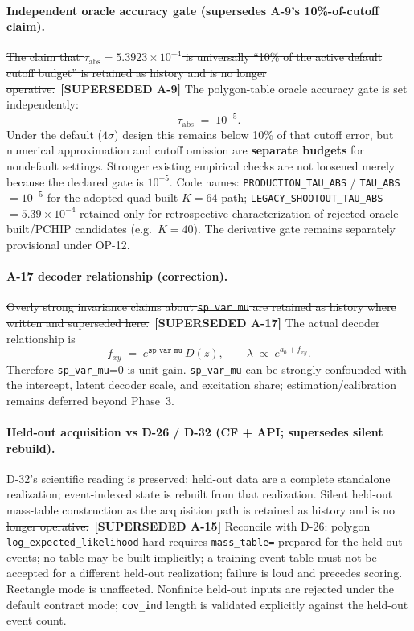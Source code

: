\documentclass[
  10pt,
]{article}
\newcommand{\amdstrike}[1]{\sout{#1}}
\newcommand{\amdstrike}[1]{\textcolor{supcolor}{#1}}
\newcommand{\supsd}[2]{{\color{supcolor}\amdstrike{#2}}~{\color{amdcolor}\footnotesize\textbf{[SUPERSEDED #1]}}}
\begin{document}
\paragraph{Independent oracle accuracy gate (supersedes A-9's 10\%-of-cutoff claim).}
\supsd{A-9}{The claim that \(\tau_{\mathrm{abs}} = 5.3923\times 10^{-4}\) is universally ``10\% of the active default cutoff budget'' is retained as history and is no longer operative.}
The polygon-table oracle accuracy gate is set independently:
\[
  \tau_{\mathrm{abs}} \;=\; 10^{-5}.
\]
Under the default (\(4\sigma\)) design this remains below 10\% of that cutoff error, but numerical approximation and cutoff omission are \textbf{separate budgets} for nondefault settings.
Stronger existing empirical checks are not loosened merely because the declared gate is \(10^{-5}\).
Code names: \texttt{PRODUCTION\_TAU\_ABS} / \texttt{TAU\_ABS} \(= 10^{-5}\) for the adopted quad-built \(K{=}64\) path; \texttt{LEGACY\_SHOOTOUT\_TAU\_ABS} \(= 5.39\times 10^{-4}\) retained only for retrospective characterization of rejected oracle-built/PCHIP candidates (e.g.\ \(K{=}40\)). The derivative gate remains separately provisional under OP-12.

\paragraph{A-17 decoder relationship (correction).}
\supsd{A-17}{Overly strong invariance claims about \texttt{sp\_var\_mu} are retained as history where written and superseded here.}
The actual decoder relationship is
\[
  f_{xy} \;=\; e^{\texttt{sp\_var\_mu}}\, D(z),
  \qquad
  \lambda \;\propto\; e^{a_0 + f_{xy}}.
\]
Therefore \texttt{sp\_var\_mu}=0 is unit gain.
\texttt{sp\_var\_mu} can be strongly confounded with the intercept, latent decoder scale, and excitation share; estimation/calibration remains deferred beyond Phase~3.

\paragraph{Held-out acquisition vs D-26 / D-32 (CF + API; supersedes silent rebuild).}
D-32's scientific reading is preserved: held-out data are a complete standalone realization; event-indexed state is rebuilt from that realization.
\supsd{A-15}{Silent held-out mass-table construction as the acquisition path is retained as history and is no longer operative.}
Reconcile with D-26: polygon \texttt{log\_expected\_likelihood} hard-requires \texttt{mass\_table=} prepared for the held-out events; no table may be built implicitly; a training-event table must not be accepted for a different held-out realization; failure is loud and precedes scoring.
Rectangle mode is unaffected.
Nonfinite held-out inputs are rejected under the default contract mode; \texttt{cov\_ind} length is validated explicitly against the held-out event count.
\end{document}
